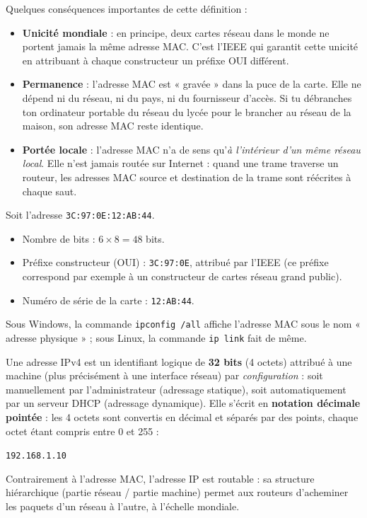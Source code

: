 \documentclass[11pt]{article}
\newcommand{\cle}[1]{{\popxbold\color{popdark}#1}}
\newcounter{popsec}
\newcounter{popsub}
\newcommand{\courssub}[1]{%
  \stepcounter{popsub}%
  \par\vspace{9pt}\noindent{\popxbold\fontsize{11.5}{13}\selectfont\color{popink}{\color{poporange}\thepopsec.\thepopsub}\hspace{6pt}#1}\par\nopagebreak\vspace{4pt}
}
\begin{document}
Quelques conséquences importantes de cette définition :

\begin{itemize}
  \item \textbf{Unicité mondiale} : en principe, deux cartes réseau dans le monde ne portent jamais la même adresse MAC. C'est l'IEEE qui garantit cette unicité en attribuant à chaque constructeur un préfixe OUI différent.
  \item \textbf{Permanence} : l'adresse MAC est « gravée » dans la puce de la carte. Elle ne dépend ni du réseau, ni du pays, ni du fournisseur d'accès. Si tu débranches ton ordinateur portable du réseau du lycée pour le brancher au réseau de la maison, son adresse MAC reste identique.
  \item \textbf{Portée locale} : l'adresse MAC n'a de sens qu'\emph{à l'intérieur d'un même réseau local}. Elle n'est jamais routée sur Internet : quand une trame traverse un routeur, les adresses MAC source et destination de la trame sont réécrites à chaque saut.
\end{itemize}

\begin{exemplebox}
Soit l'adresse \texttt{3C:97:0E:12:AB:44}.
\begin{itemize}
  \item Nombre de bits : $6 \times 8 = 48$ bits.
  \item Préfixe constructeur (OUI) : \texttt{3C:97:0E}, attribué par l'IEEE (ce préfixe correspond par exemple à un constructeur de cartes réseau grand public).
  \item Numéro de série de la carte : \texttt{12:AB:44}.
\end{itemize}
Sous Windows, la commande \texttt{ipconfig /all} affiche l'adresse MAC sous le nom « adresse physique » ; sous Linux, la commande \texttt{ip link} fait de même.
\end{exemplebox}

\courssub{L'adresse logique : l'adresse IP (IPv4)}

\begin{definition}
Une \cle{adresse IPv4} est un identifiant logique de \textbf{32 bits} (4 octets) attribué à une machine (plus précisément à une interface réseau) par \emph{configuration} : soit manuellement par l'administrateur (adressage \cle{statique}), soit automatiquement par un serveur \cle{DHCP} (adressage \cle{dynamique}). Elle s'écrit en \textbf{notation décimale pointée} : les 4 octets sont convertis en décimal et séparés par des points, chaque octet étant compris entre 0 et 255 :
\begin{center}
\texttt{192.168.1.10}
\end{center}
Contrairement à l'adresse MAC, l'adresse IP est \cle{routable} : sa structure hiérarchique (partie réseau / partie machine) permet aux routeurs d'acheminer les paquets d'un réseau à l'autre, à l'échelle mondiale.
\end{definition}
\end{document}
